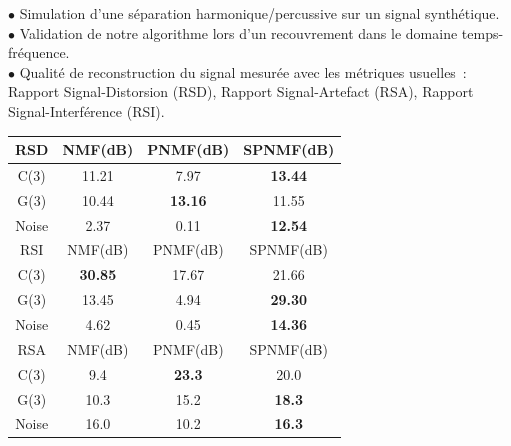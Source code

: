 \documentclass[a0paper,portrait]{baposter}
\begin{document}
\begin{poster}
{\textcolor{bgcol}{$\bullet$} Simulation d'une séparation harmonique/percussive sur un signal synthétique. \\
\textcolor{bgcol}{$\bullet$} Validation de notre algorithme lors d'un recouvrement dans le domaine temps-fréquence. \\
\textcolor{bgcol}{$\bullet$} Qualité de reconstruction du signal mesurée avec les métriques usuelles~: Rapport Signal-Distorsion (RSD), Rapport Signal-Artefact (RSA), Rapport Signal-Interférence (RSI). \\
\vspace{-0.5em}
\begin{center}
   \begin{tabular}{|c|c|c|c|}
  \hline
  RSD  & NMF(dB) & PNMF(dB) & SPNMF(dB) \\
  \hline
  C(3)  & 11.21 & 7.97   & \textbf{13.44} \\
  G(3)  & 10.44   & \textbf{13.16}  & 11.55 \\
  Noise   & 2.37  & 0.11 & \textbf{12.54} \\  
  \hline
  RSI & NMF(dB) & PNMF(dB) & SPNMF(dB) \\
  \hline
 C(3) & \textbf{30.85}   & 17.67    &  21.66  \\
 G(3) & 13.45   & 4.94   &  \textbf{29.30}  \\
 Noise & 4.62  &  0.45  &  \textbf{14.36} \\
 \hline
  RSA & NMF(dB) & PNMF(dB) & SPNMF(dB) \\
  \hline
 C(3) & 9.4   & \textbf{23.3} &   20.0 \\
 G(3) & 10.3  & 15.2 &  \textbf{18.3}  \\
 Noise & 16.0 & 10.2 &  \textbf{16.3} \\
 \hline  
\end{tabular} 
\end{center}

}

\end{poster}
\end{document}
